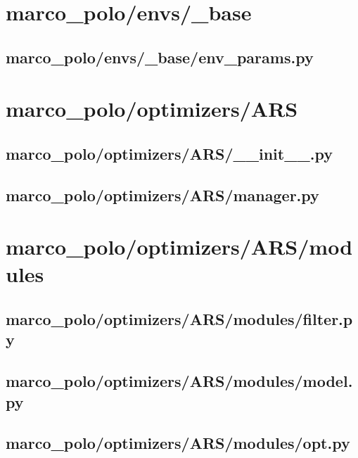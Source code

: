 \documentclass{article}
\begin{document}
\section{marco\_polo/envs/\_base}
\subsection[env\_params.py]{marco\_polo/envs/\_base/env\_params.py}

\newpage

\section{marco\_polo/optimizers/ARS}
\subsection[\_\_init\_\_.py]{marco\_polo/optimizers/ARS/\_\_init\_\_.py}

\newpage

\subsection[manager.py]{marco\_polo/optimizers/ARS/manager.py}

\newpage

\section{marco\_polo/optimizers/ARS/modules}
\subsection[filter.py]{marco\_polo/optimizers/ARS/modules/filter.py}

\newpage

\subsection[model.py]{marco\_polo/optimizers/ARS/modules/model.py}

\newpage

\subsection[opt.py]{marco\_polo/optimizers/ARS/modules/opt.py}

\newpage
\end{document}
